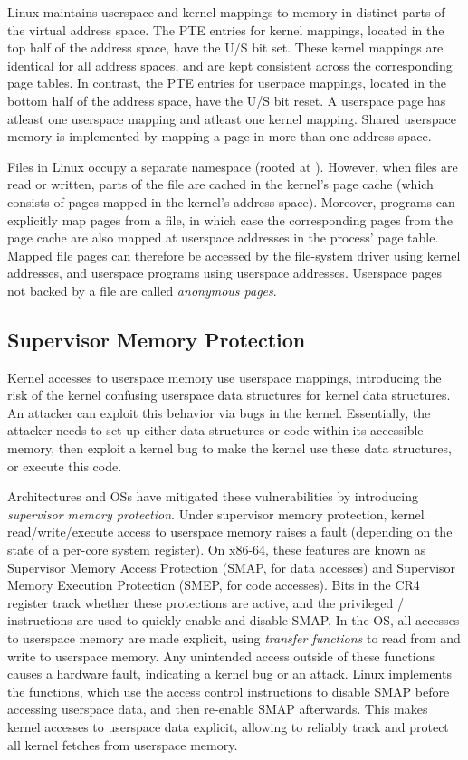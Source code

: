 \documentclass[letterpaper,twocolumn,10pt]{article}
\begin{document}
Linux maintains userspace and kernel mappings to memory in distinct
parts of the virtual address space.
The PTE entries for kernel mappings, located in the top half of the
address space, have the U/S bit set.
These kernel mappings are identical for all address spaces, and are
kept consistent across the corresponding page tables.
In contrast, the PTE entries for userpace mappings, located in the 
bottom half of the address space, have the U/S bit reset.
A userspace page has atleast one userspace mapping and atleast one
kernel mapping.
Shared userspace memory is implemented by mapping a page in more than
one address space.

Files in Linux occupy a separate namespace (rooted at \Code{/}).
However, when files are read or written, parts of the file are cached
in the kernel's page cache (which consists of pages mapped in the kernel's
address space).
Moreover, programs can explicitly map pages from a file, in which case
the corresponding pages from the page cache are also mapped at userspace
addresses in the process' page table.
Mapped file pages can therefore be accessed by the file-system driver using
kernel addresses, and userspace programs using userspace addresses.
Userspace pages not backed by a file are called \emph{anonymous pages}.


\subsection{Supervisor Memory Protection} %

Kernel accesses to userspace memory use userspace mappings, introducing
the risk of the kernel confusing userspace data structures
for kernel data structures.
An attacker can exploit this behavior via bugs in the
kernel.
Essentially, the attacker needs to set up either data structures
or code within its accessible memory, then exploit a kernel
bug to make the kernel use these data structures, or execute
this code.

Architectures and OSs have mitigated these vulnerabilities
by introducing \emph{supervisor memory protection}.
Under supervisor memory protection, kernel read/write/execute access to userspace memory
raises a fault (depending on the state of a per-core system
register).
On x86-64, these features are known as Supervisor Memory Access
Protection (SMAP, for data accesses) and Supervisor Memory Execution
Protection (SMEP, for code accesses). 
Bits in the CR4 register track whether these protections are active, 
and the privileged / instructions are used to 
quickly enable and disable SMAP.
In the OS, all accesses to userspace memory are made explicit,
using \emph{transfer functions} to read from and write to userspace memory.
Any unintended access outside of these functions causes a
hardware fault, indicating a kernel bug or an attack.
Linux implements the  functions, which
use the access control instructions to disable SMAP before
accessing userspace data, and then re-enable SMAP afterwards.  This makes
kernel accesses to userspace data explicit, allowing
\midas to reliably track and protect all kernel fetches from userspace memory.
\end{document}
